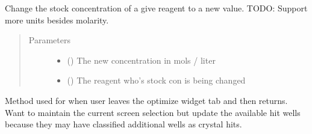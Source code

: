 \documentclass[letterpaper,10pt,english]{sphinxmanual}
\begin{document}
\begin{fulllineitems}
\begin{fulllineitems}
\begin{quote}
\begin{description}
\end{description}\end{quote}

\end{fulllineitems}


\begin{fulllineitems}
\label{\detokenize{polo.widgets:polo.widgets.optimize_widget.OptimizeWidget.change_reagent_stock_con}}
Change the stock concentration of a give reagent to a new value.
TODO: Support more units besides molarity.
\begin{quote}\begin{description}
\item[{Parameters}] \leavevmode\begin{itemize}
\item {} 
 () \textendash{} The new concentration in mols / liter

\item {} 
 ({\hyperref[\detokenize{polo.crystallography:polo.crystallography.cocktail.Reagent}]{}}) \textendash{} The reagent who’s stock con is being changed

\end{itemize}

\end{description}\end{quote}

\end{fulllineitems}


\begin{fulllineitems}
\label{\detokenize{polo.widgets:polo.widgets.optimize_widget.OptimizeWidget.changed_tab_update}}
Method used for when user leaves the optimize widget tab and then
returns. Want to maintain the current screen selection but update
the available hit wells because they may have classified additional
wells as crystal hits.


\end{fulllineitems}
\end{fulllineitems}
\end{document}
